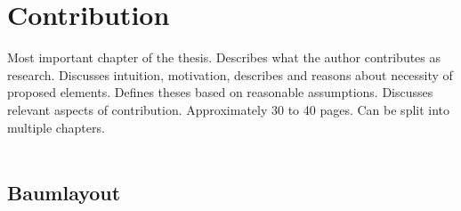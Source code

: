 \chapter{Contribution}\label{sec:contribution}

Most important chapter of the thesis. Describes what the author contributes as research. Discusses intuition, motivation, describes and reasons about necessity of proposed elements. Defines theses based on reasonable assumptions. Discusses relevant aspects of contribution. Approximately 30 to 40 pages. Can be split into multiple chapters.
\\\\

\section{Baumlayout}

